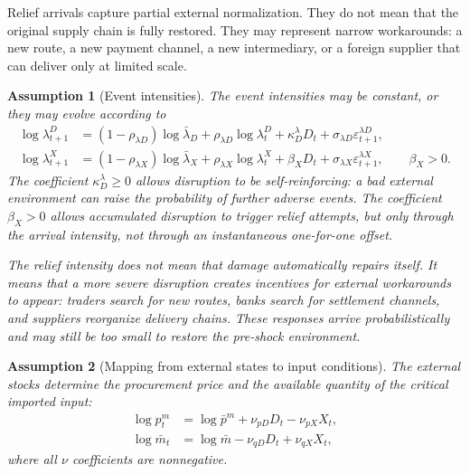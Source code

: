 ﻿\documentclass[12pt]{article}
\newtheorem{assumption}{Assumption}
\theoremstyle{remark}
\begin{document}
Relief arrivals capture partial external normalization. They do not mean that the original supply
chain is fully restored. They may represent narrow workarounds: a new route, a new payment channel,
a new intermediary, or a foreign supplier that can deliver only at limited scale.

\begin{assumption}[Event intensities]\label{ass:intensities}
The event intensities may be constant, or they may evolve according to
\begin{align}
    \log\lambda_{t+1}^D
    &=
    (1-\rho_{\lambda D})\log\bar\lambda_D
    +
    \rho_{\lambda D}\log\lambda_t^D
    +
    \kappa_D^\lambda D_t
    +
    \sigma_{\lambda D}\varepsilon_{t+1}^{\lambda D},
    \label{eq:lambda_D_law}\\
    \log\lambda_{t+1}^X
    &=
    (1-\rho_{\lambda X})\log\bar\lambda_X
    +
    \rho_{\lambda X}\log\lambda_t^X
    +
    \beta_X D_t
    +
    \sigma_{\lambda X}\varepsilon_{t+1}^{\lambda X},
    \qquad
    \beta_X>0.
    \label{eq:lambda_X_law}
\end{align}
The coefficient $\kappa_D^\lambda\ge 0$ allows disruption to be self-reinforcing: a bad external environment
can raise the probability of further adverse events. The coefficient $\beta_X>0$ allows accumulated
disruption to trigger relief attempts, but only through the arrival intensity, not through an
instantaneous one-for-one offset.

The relief intensity does not mean that damage automatically repairs itself. It means that a more
severe disruption creates incentives for external workarounds to appear: traders search for new
routes, banks search for settlement channels, and suppliers reorganize delivery chains. These
responses arrive probabilistically and may still be too small to restore the pre-shock environment.
\end{assumption}

\begin{assumption}[Mapping from external states to input conditions]\label{ass:DX_mapping}
The external stocks determine the procurement price and the available quantity of the critical
imported input:
\begin{align}
    \log p_t^m
    &=
    \log\bar p^m
    +
    \nu_{pD}D_t
    -
    \nu_{pX}X_t,
    \label{eq:pm_DX}\\
    \log\bar m_t
    &=
    \log\bar m
    -
    \nu_{qD}D_t
    +
    \nu_{qX}X_t,
    \label{eq:mbar_DX}
\end{align}
where all $\nu$ coefficients are nonnegative.
\end{assumption}
\end{document}
